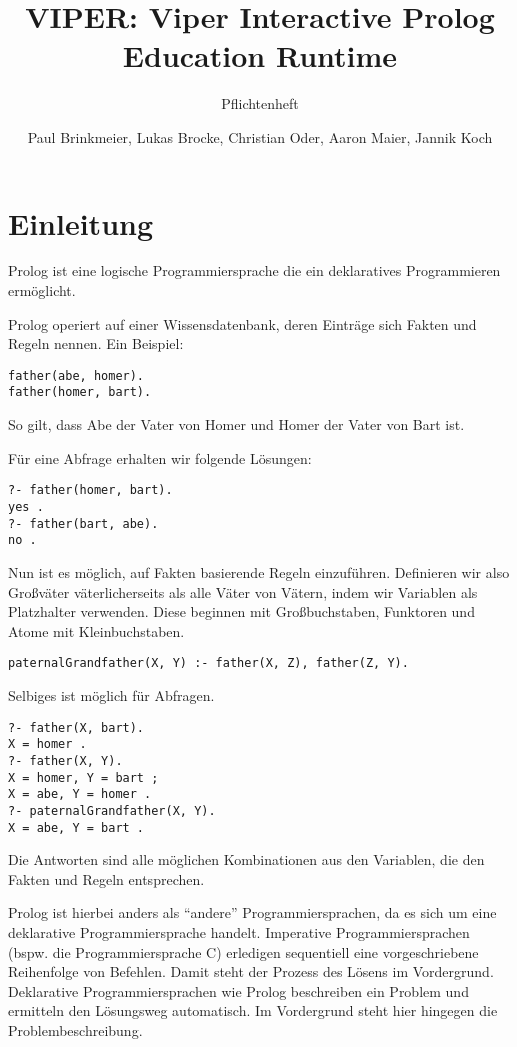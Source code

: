 \documentclass[parskip=full,11pt,twoside]{scrartcl}
\title{VIPER: Viper Interactive Prolog Education Runtime}
\subtitle{Pflichtenheft}
\author{Paul Brinkmeier, Lukas Brocke, Christian Oder, Aaron Maier, Jannik Koch}
\begin{document}
\maketitle

\section{Einleitung}

Prolog ist eine logische Programmiersprache die ein deklaratives Programmieren ermöglicht.

Prolog operiert auf einer Wissensdatenbank, deren Einträge sich Fakten und Regeln nennen. Ein Beispiel:

\begin{lstlisting}
father(abe, homer).
father(homer, bart).
\end{lstlisting}

So gilt, dass Abe der Vater von Homer und Homer der Vater von Bart ist.

Für eine Abfrage erhalten wir folgende Lösungen:

\begin{lstlisting}
?- father(homer, bart).
yes .
?- father(bart, abe).
no .
\end{lstlisting}

Nun ist es möglich, auf Fakten basierende Regeln einzuführen. Definieren wir also Großväter väterlicherseits als alle Väter von Vätern, indem wir Variablen als Platzhalter verwenden. Diese beginnen mit Großbuchstaben, Funktoren und Atome mit Kleinbuchstaben.

\begin{lstlisting}
paternalGrandfather(X, Y) :- father(X, Z), father(Z, Y).
\end{lstlisting}

Selbiges ist möglich für Abfragen.

\begin{lstlisting}
?- father(X, bart).
X = homer .
?- father(X, Y).
X = homer, Y = bart ;
X = abe, Y = homer .
?- paternalGrandfather(X, Y).
X = abe, Y = bart .
\end{lstlisting}

Die Antworten sind alle möglichen Kombinationen aus den Variablen, die den Fakten und Regeln entsprechen.

Prolog ist hierbei anders als \enquote{andere} Programmiersprachen, da es sich um eine deklarative Programmiersprache handelt. Imperative Programmiersprachen (bspw. die Programmiersprache C) erledigen sequentiell eine vorgeschriebene Reihenfolge von Befehlen. Damit steht der Prozess des Lösens im Vordergrund. Deklarative Programmiersprachen wie Prolog beschreiben ein Problem und ermitteln den Lösungsweg automatisch. Im Vordergrund steht hier hingegen die Problembeschreibung.
\end{document}
